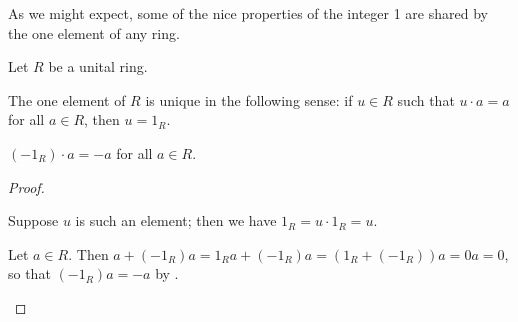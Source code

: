 As we might expect, some of the nice properties of the integer 1 are shared by the one element of any ring.

\begin{prop}
Let \(R\) be a unital ring.
\begin{proplist*}
\item The one element of \(R\) is unique in the following sense: if \(u \in R\) such that \(u \cdot a = a\) for all \(a \in R\), then \(u = 1_R\).
\item \((-1_R) \cdot a = -a\) for all \(a \in R\).
\end{proplist*}
\end{prop}

\begin{proof}
\begin{inlineproplist}
\item Suppose \(u\) is such an element; then we have \(1_R = u \cdot 1_R = u\).
\item Let \(a \in R\).
Then \(a + (-1_R)a = 1_R a + (-1_R)a = (1_R + (-1_R))a = 0a = 0\), so that \((-1_R)a = -a\) by .
\end{inlineproplist}
\end{proof}

